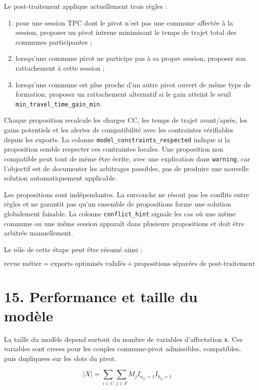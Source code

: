 \documentclass[11pt,a4paper]{article}
\begin{document}
Le post-traitement applique actuellement trois règles :

\begin{enumerate}
\item pour une session TPC dont le pivot n'est pas une commune affectée à la session, proposer un pivot interne minimisant le temps de trajet total des communes participantes ;
\item lorsqu'une commune pivot ne participe pas à sa propre session, proposer son rattachement à cette session ;
\item lorsqu'une commune est plus proche d'un autre pivot ouvert de même type de formation, proposer un rattachement alternatif si le gain atteint le seuil \texttt{min\_travel\_time\_gain\_min}.
\end{enumerate}

Chaque proposition recalcule les charges CC, les temps de trajet avant/après, les gains potentiels et les alertes de compatibilité avec les contraintes vérifiables depuis les exports. La colonne \texttt{model\_constraints\_respected} indique si la proposition semble respecter ces contraintes locales. Une proposition non compatible peut tout de même être écrite, avec une explication dans \texttt{warning}, car l'objectif est de documenter les arbitrages possibles, pas de produire une nouvelle solution automatiquement applicable.

Les propositions sont indépendantes. La surcouche ne résout pas les conflits entre règles et ne garantit pas qu'un ensemble de propositions forme une solution globalement faisable. La colonne \texttt{conflict\_hint} signale les cas où une même commune ou une même session apparaît dans plusieurs propositions et doit être arbitrée manuellement.

Le rôle de cette étape peut être résumé ainsi :

\[
\text{revue métier}
=
\text{exports optimisés validés}
+
\text{propositions séparées de post-traitement}
\]

\section{15. Performance et taille du modèle}

La taille du modèle depend surtout du nombre de variables d'affectation \texttt{x}. Ces variables sont creees pour les couples commune-pivot admissibles, compatibles, puis dupliquees sur les slots du pivot.

\[
\left|X\right|
=
\sum_{i\in C}
\sum_{j\in F}
M_j
I_{a_{ij}=1}
I_{b_{ij}=1}
\]
\end{document}
